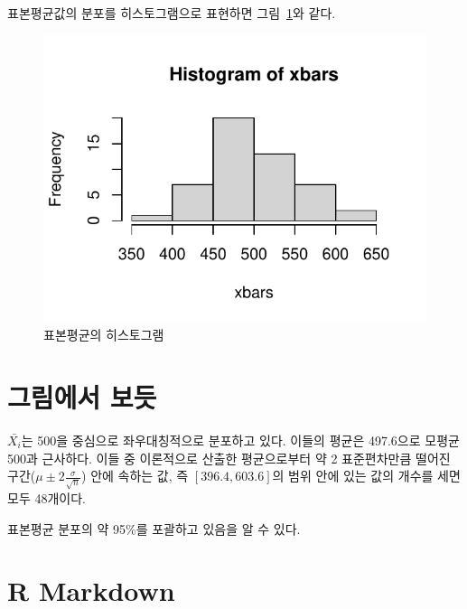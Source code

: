 \documentclass[
  chapter,a4paper,showtrims,openright,hidelinks]{oblivoir}
\begin{document}
표본평균값의 분포를 히스토그램으로 표현하면 그림~\ref{fig-test}와
같다.

\begin{figure}

{\centering \includegraphics{clt_files/figure-pdf/fig-test-1.pdf}

}

\caption{\label{fig-test}표본평균의 히스토그램}

\end{figure}

\hypertarget{uxadf8uxb9bcuxc5d0uxc11c-uxbcf4uxb4ef}{%
\section{그림에서 보듯}\label{uxadf8uxb9bcuxc5d0uxc11c-uxbcf4uxb4ef}}

\(\bar{X_i}\)는 500을 중심으로 좌우대칭적으로 분포하고 있다.
이들의 평균은 497.6으로 모평균 500과
근사하다. 이들 중 이론적으로 산출한
평균으로부터 약 2 표준편차만큼 떨어진
구간(\(\mu \pm 2\frac{\sigma}{\sqrt{n}}\)) 안에 속하는 값, 즉
\([396.4, 603.6]\)의 범위 안에 있는 값의 개수를 세면 모두
48개이다.

표본평균 분포의 약 95\%를 포괄하고 있음을 알 수
있다.

\hypertarget{r-markdown}{%
\section{R Markdown}\label{r-markdown}}
\end{document}
